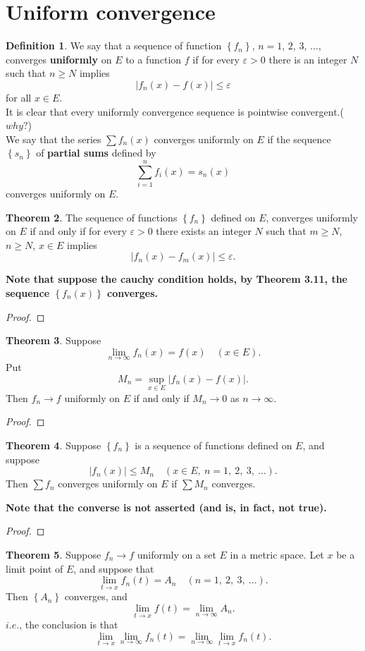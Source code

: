\documentclass[12pt]{book}
\theoremstyle{definition}
\newtheorem{theorem}{Theorem}[chapter]
\newtheorem{definition}[theorem]{Definition}
\begin{document}
	\section*{Uniform convergence}
	\begin{definition}
		We say that a sequence of function $\left\{f_n\right\}$, $n=1$, $2$, $3$, $\ldots$, converges \textbf{uniformly} on $E$ to a function $f$ if for every $\varepsilon >0$ there is an integer $N$ such that $n\geq N$ implies $$|f_n(x)-f(x)|\leq\varepsilon$$ for all $x\in E$.
		\\It is clear that every uniformly convergence sequence is pointwise convergent.($why?$)\\
		We say that the series $\sum f_n(x)$ converges uniformly on $E$ if the sequence $\left\{s_n\right\}$ of \textbf{partial sums} defined by $$\displaystyle\sum_{i=1}^{n} f_i(x)=s_n(x)$$ converges uniformly on $E$.
	\end{definition}
	\newpage
	\begin{theorem}
		The sequence of functions $\left\{f_n\right\}$ defined on $E$, converges uniformly on $E$ if and only if for every $\varepsilon>0$ there exists an integer $N$ such that $m\geq N$, $n\geq N$, $x\in E$ implies $$|f_n(x)-f_m(x)|\leq\varepsilon.$$
	\end{theorem}
	\textbf{Note that suppose the cauchy condition holds, by Theorem 3.11, the sequence $\left\{f_n(x)\right\}$ converges.}
	\begin{proof}
	\end{proof}
	\newpage
	\begin{theorem}
		Suppose
		$$\lim_{n\rightarrow\infty}f_n(x)=f(x)\quad (x\in E).$$
		Put
		$$M_n=\sup_{x\in E} |f_n(x)-f(x)|.$$
		Then $f_n\rightarrow f$ uniformly on $E$ if and only if $M_n\rightarrow 0$ as $n\rightarrow \infty$.
	\end{theorem}
	\begin{proof}
	\end{proof}
	\newpage
	\begin{theorem}
		Suppose $\left\{f_n\right\}$ is a sequence of functions defined on $E$, and suppose $$|f_n(x)|\leq M_n\quad (x\in E,~n=1,~2,~3,~\ldots).$$
		Then $\sum f_n$ converges uniformly on $E$ if $\sum M_n$ converges.
	\end{theorem}
	\textbf{Note that the converse is not asserted (and is, in fact, not true).}
	\begin{proof}
	\end{proof}
	\newpage
	\begin{theorem}
		Suppose $f_n\rightarrow f$ uniformly on a set $E$ in a metric space. Let $x$ be a limit point of $E$, and suppose that $$\lim_{t\rightarrow x} f_n(t)=A_n\quad (n=1,~2,~3,~\ldots).$$ Then $\left\{A_n\right\}$ converges, and $$\lim_{t\rightarrow x}f(t)=\lim_{n\rightarrow\infty}A_n.$$ $i.e.$, the conclusion is that $$\lim_{t\rightarrow x}\lim_{n\rightarrow \infty}f_n(t)=\lim_{n\rightarrow\infty}\lim_{t\rightarrow x} f_n(t).$$
	\end{theorem}
\end{document}
